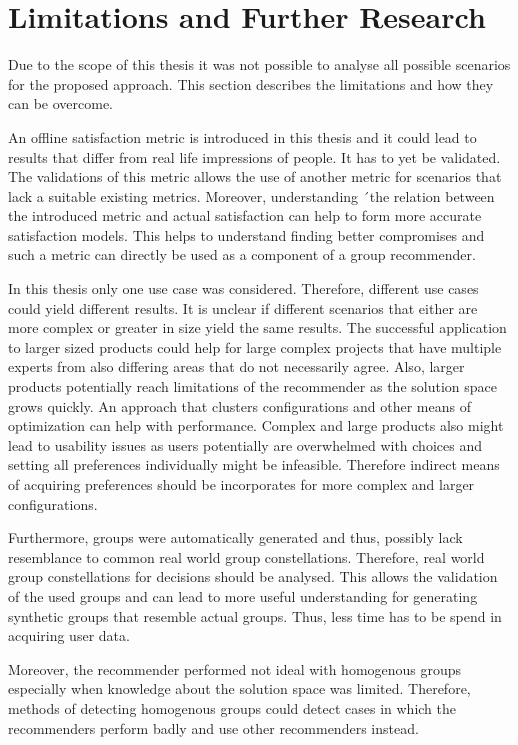 \section{Limitations and Further Research}
\label{sec:Conclusion:LimitationsFurtherResearch}

Due to the scope of this thesis it was not possible to analyse all possible scenarios for the proposed approach. This section describes the limitations and how they can be overcome.

An offline satisfaction metric is introduced in this thesis and it could lead to results that differ from real life impressions of people. It has to yet be validated. The validations of this metric allows the use of another metric for scenarios that lack a suitable existing metrics. Moreover, understanding ´the relation between the introduced metric and actual satisfaction can help to form more accurate satisfaction models. This helps to understand finding better compromises and such a metric can directly be used as a component of a group recommender.

In this thesis only one use case was considered. Therefore, different use cases could yield different results. It is unclear if different scenarios that either are more complex or greater in size yield the same results. The successful application to larger sized products could help for large complex projects that have multiple experts from also differing areas that do not necessarily agree. Also, larger products potentially reach limitations of the recommender as the solution space grows quickly. An approach that clusters configurations and other means of optimization can help with performance. Complex and large products also might lead to usability issues as users potentially are overwhelmed with choices and setting all preferences individually might be infeasible. Therefore indirect means of acquiring preferences should be incorporates for more complex and larger configurations. 

Furthermore, groups were automatically generated and thus, possibly lack resemblance to common real world group constellations. Therefore, real world group constellations for decisions should be analysed. This allows the validation of the used groups and can lead to more useful understanding for generating synthetic groups that resemble actual groups. Thus, less time has to be spend in acquiring user data.

Moreover, the recommender performed not ideal with homogenous groups especially when knowledge about the solution space was limited. Therefore, methods of detecting homogenous groups could detect cases in which the recommenders perform badly and use other recommenders instead.

